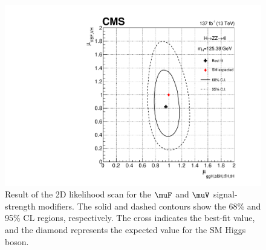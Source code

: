 \begin{figure}[!htb]
\begin{center}
\includegraphics[width=0.9\linewidth]{Figures/results/signalstrength/rvrf_125_38.pdf}
\caption{
Result of the 2D likelihood scan for the $\muF$ and $\muV$ signal-strength modifiers.
The solid and dashed contours show the 68\% and 95\% CL regions, respectively.
The cross indicates the best-fit value, and the diamond represents the expected value for the SM Higgs boson.
\label{fig:mu2D}}
\end{center}
\end{figure}








